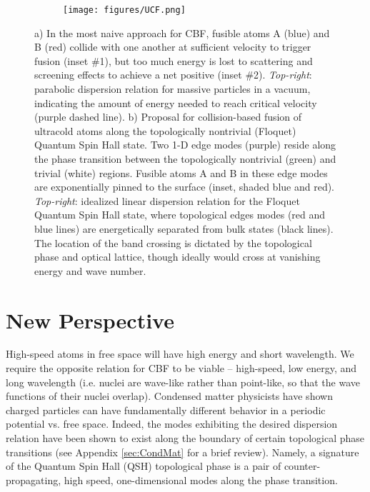 \documentclass[onecolumn,
               superscriptaddress,
               floatfix,
               longbibliography, 
               showkeys,apl]{revtex4-2}
\begin{document}
\begin{figure}[H]
\begin{subfigure}{.5\textwidth}
    \centering
    \caption{}    
    \label{subfig:CBF}
\end{subfigure}
\begin{subfigure}{.5\textwidth}
    \centering
    \texttt{[image: figures/UCF.png]}
    \caption{}
    \label{subfig:UCF}
\end{subfigure}
\caption{a) In the most naive approach for CBF, fusible atoms A (blue) and B (red) collide with one another at sufficient velocity to trigger fusion (inset \#1), but too much energy is lost to scattering and screening effects to achieve a net positive (inset \#2). \textit{Top-right}: parabolic dispersion relation for massive particles in a vacuum, indicating the amount of energy needed to reach critical velocity (purple dashed line). b) Proposal for collision-based fusion of ultracold atoms along the topologically nontrivial (Floquet) Quantum Spin Hall state. Two 1-D edge modes (purple) reside along the phase transition between the topologically nontrivial (green) and trivial (white) regions. Fusible atoms A and B in these edge modes are exponentially pinned to the surface (inset, shaded blue and red). \textit{Top-right}: idealized linear dispersion relation for the Floquet Quantum Spin Hall state, where topological edges modes (red and blue lines) are energetically separated from bulk states (black lines). The location of the band crossing is dictated by the topological phase and optical lattice, though ideally would cross at vanishing energy and wave number.}
\end{figure}


\section{New Perspective}

High-speed atoms in free space will have high energy and short wavelength. We require the opposite relation for CBF to be viable -- high-speed, low energy, and long wavelength (i.e. nuclei are wave-like rather than point-like, so that the wave functions of their nuclei overlap). Condensed matter physicists have shown charged particles can have fundamentally different behavior in a periodic potential vs. free space. 
Indeed, the modes exhibiting the desired dispersion relation have been shown to exist along the boundary of certain topological phase transitions (see Appendix \ref{sec:CondMat} for a brief review). Namely, a signature of the Quantum Spin Hall (QSH) topological phase is a pair of counter-propagating, high speed, one-dimensional modes along the phase transition.
\end{document}
